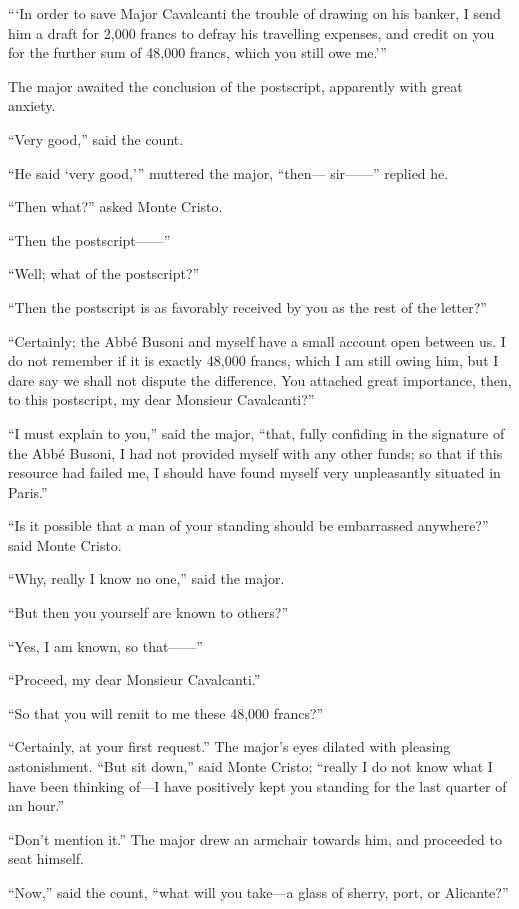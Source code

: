 “‘In order to save Major Cavalcanti the trouble of drawing on his
banker, I send him a draft for 2,000 francs to defray his travelling
expenses, and credit on you for the further sum of 48,000 francs, which
you still owe me.’”

The major awaited the conclusion of the postscript, apparently with
great anxiety.

“Very good,” said the count.

“He said ‘very good,’” muttered the major, “then— sir——” replied he.

“Then what?” asked Monte Cristo.

“Then the postscript——”

“Well; what of the postscript?”

“Then the postscript is as favorably received by you as the rest of the
letter?”

“Certainly; the Abbé Busoni and myself have a small account open
between us. I do not remember if it is exactly 48,000 francs, which I
am still owing him, but I dare say we shall not dispute the difference.
You attached great importance, then, to this postscript, my dear
Monsieur Cavalcanti?”

“I must explain to you,” said the major, “that, fully confiding in the
signature of the Abbé Busoni, I had not provided myself with any other
funds; so that if this resource had failed me, I should have found
myself very unpleasantly situated in Paris.”

“Is it possible that a man of your standing should be embarrassed
anywhere?” said Monte Cristo.

“Why, really I know no one,” said the major.

“But then you yourself are known to others?”

“Yes, I am known, so that——”

“Proceed, my dear Monsieur Cavalcanti.”

“So that you will remit to me these 48,000 francs?”

“Certainly, at your first request.” The major’s eyes dilated with
pleasing astonishment. “But sit down,” said Monte Cristo; “really I do
not know what I have been thinking of—I have positively kept you
standing for the last quarter of an hour.”

“Don’t mention it.” The major drew an armchair towards him, and
proceeded to seat himself.

“Now,” said the count, “what will you take—a glass of sherry, port, or
Alicante?”

